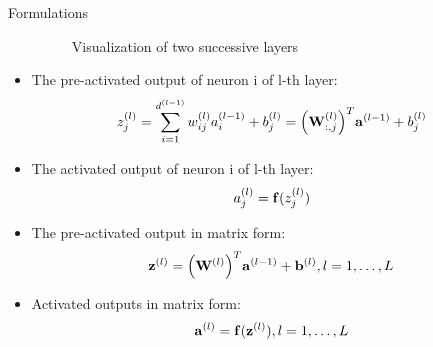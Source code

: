 \documentclass[10pt]{beamer}
\theoremstyle{remark}
\theoremstyle{definition}
\begin{document}
\begin{frame}[allowframebreaks]{Formulations}
\begin{itemize}
\begin{figure}
{
			}
			\caption{Visualization of two successive layers}
		\end{figure}
		\item The pre-activated output of neuron i of l-th layer:
		\begin{equation}
			z_j^{(l)}=\sum_{i=1}^{d^{(l-1)}}w_{ij}^{(l)}a_i^{(l-1)}+b_j^{(l)}=\Big(\bold{W}_{:,j}^{(l)}\Big)^T \bold{a}^{(l-1)} + b_j^{(l)}
		\end{equation}
		\item The activated output of neuron i of l-th layer:
		\begin{equation}
			a_j^{(l)} = \bold{f}(z_j^{(l)})
		\end{equation}
		\item The pre-activated output in matrix form:
		\begin{equation}
			\bold{z}^{(l)}=\Big(\bold{W}^{(l)}\Big)^T\bold{a}^{(l-1)} + \bold{b}^{(l)}, l=1, \dots, L
		\end{equation}
		\item Activated outputs in matrix form:
		\begin{equation}
			\bold{a}^{(l)}=\bold{f}(\bold{z}^{(l)}), l=1, \dots, L
		\end{equation}
		\begin{figure}
			\centering
			\resizebox{8.0cm}{!}{
				\begin{tikzpicture}
	

\end{tikzpicture}}
\end{figure}
\end{itemize}
\end{frame}
\end{document}

